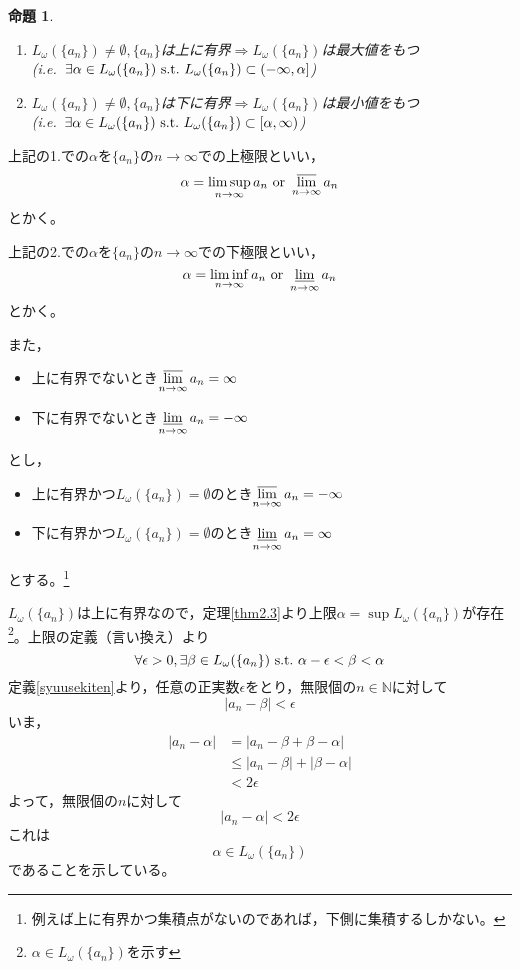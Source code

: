 \documentclass[dvipdfmx,a4j,10pt]{jsarticle}
\makeatletter
\theoremstyle{mystyle1}
\newtheorem{prop}[dfn]{命題}
\theoremstyle{mystyle2}
\renewenvironment{proof}[1][\proofname]{\par
  \pushQED{\qed}%
  \normalfont
  \topsep6\p@\@plus6\p@ \trivlist
  \item[\hskip\labelsep{\bfseries\sffamily #1}]\ignorespaces
}{%
  \popQED\endtrivlist\@endpefalse
}
\renewcommand\proofname{証明}
\makeatother
\begin{document}
\newpage

\begin{framed}
\begin{prop}　\label{prop1}
\begin{enumerate}
	\item $L_\omega(\{a_n\})\neq\emptyset,\{a_n\}$は上に有界$\Longrightarrow$$L_\omega(\{a_n\})$は最大値をもつ\\
		(i.e.\ $\exists\alpha\in L_\omega(\{a_n\})\ {\rm s.t.}\ L_\omega(\{a_n\})\subset(-\infty,\alpha]$)
	\item $L_\omega(\{a_n\})\neq\emptyset,\{a_n\}$は下に有界$\Longrightarrow$$L_\omega(\{a_n\})$は最小値をもつ\\
		(i.e.\ $\exists\alpha\in L_\omega(\{a_n\})\ {\rm s.t.}\ L_\omega(\{a_n\})\subset[\alpha,\infty)$)
\end{enumerate}
\end{prop}
\end{framed}
\par
上記の1.での$\alpha$を$\{a_n\}$の$n\to\infty$での上極限といい，
\[\alpha=\limsup_{n\to\infty}a_n\ {\rm or}\ \varlimsup_{n\to\infty}a_n\]
とかく。
\par
上記の2.での$\alpha$を$\{a_n\}$の$n\to\infty$での下極限といい，
\[\alpha=\liminf_{n\to\infty}a_n\ {\rm or}\ \varliminf_{n\to\infty}a_n\]
とかく。
\par
また，
\begin{itemize}
	\item 上に有界でないとき$\displaystyle \varlimsup_{n\to\infty}a_n=\infty$
	\item 下に有界でないとき$\displaystyle \varliminf_{n\to\infty}a_n=-\infty$
\end{itemize}
とし，
\begin{itemize}
	\item 上に有界かつ$L_\omega(\{a_n\})=\emptyset$のとき$\displaystyle \varlimsup_{n\to\infty}a_n=-\infty$
	\item 下に有界かつ$L_\omega(\{a_n\})=\emptyset$のとき$\displaystyle \varliminf_{n\to\infty}a_n=\infty$
\end{itemize}
とする。\footnote{例えば上に有界かつ集積点がないのであれば，下側に集積するしかない。}

\begin{proof}[命題\ref{prop1}の証明]
    $L_\omega(\{a_n\})$は上に有界なので，定理\ref{thm2.3}より上限$\alpha=\sup L_\omega(\{a_n\})$が存在\footnote{$\alpha\in L_\omega(\{a_n\})$を示す}。上限の定義（言い換え）より
    \[\forall\epsilon>0,\exists\beta\in L_\omega(\{a_n\})\ {\rm s.t.}\ \alpha-\epsilon<\beta<\alpha\]
    定義\ref{syuusekiten}より，任意の正実数$\epsilon$をとり，無限個の$n\in\mathbb{N}$に対して
    \[|a_n-\beta|<\epsilon\]
    いま，
    \[
    \begin{split}
    |a_n-\alpha|&=|a_n-\beta+\beta-\alpha|\\
    &\leq|a_n-\beta|+|\beta-\alpha|\\
    &<2\epsilon
    \end{split}
    \]
    よって，無限個の$n$に対して
    \[|a_n-\alpha|<2\epsilon\]
    これは
    \[\alpha\in L_\omega(\{a_n\})\]
    であることを示している。
\end{proof}
\end{document}
